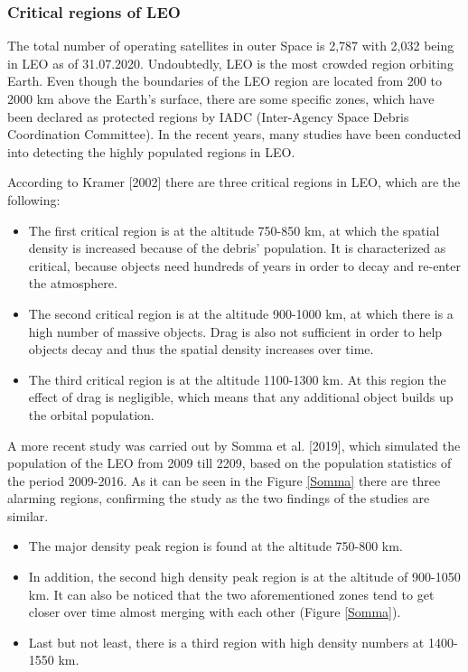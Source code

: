 \bigskip
\subsubsection{Critical regions of LEO}
\bigskip

The total number of operating satellites in outer Space is 2,787 with 2,032 being in LEO as of 31.07.2020. \cite{UCS} Undoubtedly, LEO is the most crowded region orbiting Earth. Even though the boundaries of the LEO region are located from 200 to 2000 km above the Earth's surface, there are some specific zones, which have been declared as protected regions by IADC (Inter-Agency Space Debris Coordination Committee). \cite{IADC 2007} In the recent years, many studies have been conducted into detecting the highly populated regions in LEO.

According to Kramer [2002] there are three critical regions in LEO, which are the following:
\begin{itemize}
\item The first critical region is at the altitude 750-850 km, at which the spatial density is increased because of the debris' population. It is characterized as critical, because objects need hundreds of years in order to decay and re-enter the atmosphere.
\item The second critical region is at the altitude 900-1000 km, at which there is a high number of massive objects. Drag is also not sufficient in order to help objects decay and thus the spatial density increases over time.
\item The third critical region is at the altitude 1100-1300 km. At this region the effect of drag is negligible, which means that any additional object builds up the orbital population.
\end{itemize}

A more recent study was carried out by Somma et al. [2019], which simulated the population of the LEO from 2009 till 2209, based on the population statistics of the period 2009-2016. As it can be seen in the Figure \ref{Somma} there are three alarming regions, confirming the \cite{Kramer 2002} study as the two findings of the studies are similar.
\begin{itemize}
\item The major density peak region is found at the altitude 750-800 km.
\item In addition, the second high density peak region is at the altitude of 900-1050 km. It can also be noticed that the two aforementioned zones tend to get closer over time almost merging with each other (Figure \ref{Somma}).
\item Last but not least, there is a third region with high density numbers at 1400-1550 km.
\end{itemize} 

